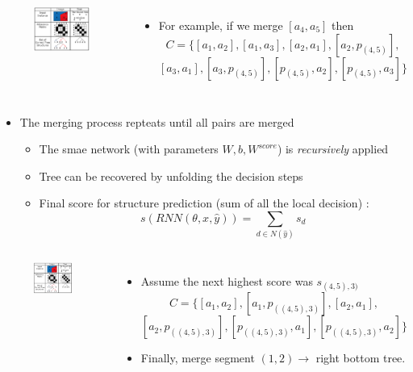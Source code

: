 \documentclass{beamer}
\begin{document}
\frame
{
	\begin{columns}
	\begin{figure}[ht]  
		\begin{center}
			\includegraphics[width=2.in]{images/fig3.png}   
		\end{center}   
	\end{figure}
	\begin{itemize}
		\item For example, if we merge $[a_4, a_5]$ then 
		$$ C = \{[a_1, a_2], [a_1, a_3], [a_2, a_1], [a_2, p_{(4,5)}], $$
		$$ [a_3, a_1], [a_3, p_{(4,5)}], [p_{(4,5)}, a_2], [p_{(4,5)}, a_3]\} $$
	\end{itemize}
	\end{columns}
}
\frame
{
	\begin{itemize}
		\item The merging process repteats until all pairs are merged
		\begin{itemize}
		\item The smae network (with parameters $W, b, W^{score}$) is \emph{recursively} applied
		\item Tree can be recovered by unfolding the decision steps
		\item Final score for structure prediction (sum of all the local decision) :
		$$ s(RNN(\theta, x, \hat{y})) = \sum_{d\in N(\hat{y})} s_d  $$ 
		\end{itemize}
	\end{itemize}
}
\frame
{
	\begin{columns}
	\column{0.45\textwidth}
	\begin{figure}[ht]  
		\begin{center}
			\includegraphics[width=2.in]{images/fig3.png}   
		\end{center}   
	\end{figure}
	\column{0.73\textwidth} 
	\begin{itemize}
		\item Assume the next highest score was $s_{(4,5),3)}$
		$$ C = \{[a_1, a_2], [a_1, p_{((4,5), 3)}], [a_2, a_1], $$
		$$ [a_2, p_{((4,5), 3)}], [p_{((4,5), 3)}, a_1], [p_{((4,5), 3)}, a_2]\} $$
		\item Finally, merge segment $(1,2) \rightarrow$ right bottom tree. 
	\end{itemize}
	\end{columns}
}
\end{document}
